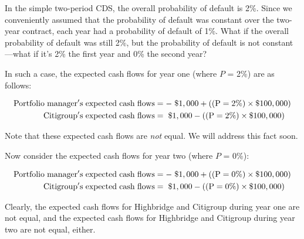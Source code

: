 \documentclass{jss}
\begin{document}
In the simple two-period CDS, the overall probability of default is 2\%. Since we conveniently assumed that the probability of default was constant over the two-year contract, each year had a probability of default of 1\%. What if the overall probability of default was still 2\%, but the probability of default is not constant---what if it's 2\% the first year and 0\% the second year?

In such a case, the expected cash flows for year one (where $P$ = 2\%) are as follows:

\begin{align}
   \rm Portfolio\hspace{3pt}manager's\hspace{3pt}expected\hspace{3pt}cash\hspace{3pt}flows &= \rm -\hspace{3pt}\$1,000 + ((P = 2\%) \times {\$100,000}) \\
    \rm Citigroup's\hspace{3pt}expected\hspace{3pt}cash\hspace{3pt}flows &= \rm \hspace{3pt}\$1,000 - ((P = 2\%) \times {\$100,000})
\end{align}

Note that these expected cash flows are \emph{not} equal. We will address this fact soon.

Now consider the expected cash flows for year two (where $P$ = 0\%):

\begin{align}
   \rm Portfolio\hspace{3pt}manager's\hspace{3pt}expected\hspace{3pt}cash\hspace{3pt}flows &= \rm -\hspace{3pt}\$1,000 + ((P = 0\%) \times {\$100,000}) \\
    \rm Citigroup's\hspace{3pt}expected\hspace{3pt}cash\hspace{3pt}flows &= \rm \hspace{3pt}\$1,000 - ((P = 0\%) \times {\$100,000}) 
\end{align}

Clearly, the expected cash flows for Highbridge and Citigroup during year one are not equal, and the expected cash flows for Highbridge and Citigroup during year two are not equal, either.
\end{document}
